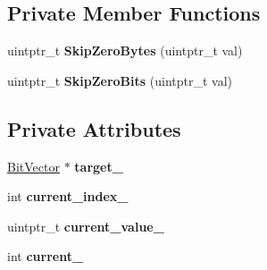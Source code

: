 \subsection*{Private Member Functions}
\begin{DoxyCompactItemize}
\item 
uintptr\+\_\+t {\bfseries Skip\+Zero\+Bytes} (uintptr\+\_\+t val)\hypertarget{classv8_1_1internal_1_1_bit_vector_1_1_b_a_s_e___e_m_b_e_d_d_e_d_ac69047709aebe576f894646bf5abe148}{}\label{classv8_1_1internal_1_1_bit_vector_1_1_b_a_s_e___e_m_b_e_d_d_e_d_ac69047709aebe576f894646bf5abe148}

\item 
uintptr\+\_\+t {\bfseries Skip\+Zero\+Bits} (uintptr\+\_\+t val)\hypertarget{classv8_1_1internal_1_1_bit_vector_1_1_b_a_s_e___e_m_b_e_d_d_e_d_a36d487012231ae329cf1cea935b838d4}{}\label{classv8_1_1internal_1_1_bit_vector_1_1_b_a_s_e___e_m_b_e_d_d_e_d_a36d487012231ae329cf1cea935b838d4}

\end{DoxyCompactItemize}
\subsection*{Private Attributes}
\begin{DoxyCompactItemize}
\item 
\hyperlink{classv8_1_1internal_1_1_bit_vector}{Bit\+Vector} $\ast$ {\bfseries target\+\_\+}\hypertarget{classv8_1_1internal_1_1_bit_vector_1_1_b_a_s_e___e_m_b_e_d_d_e_d_ac5fc3432c93f91aa3cb1d36f18b6f6b1}{}\label{classv8_1_1internal_1_1_bit_vector_1_1_b_a_s_e___e_m_b_e_d_d_e_d_ac5fc3432c93f91aa3cb1d36f18b6f6b1}

\item 
int {\bfseries current\+\_\+index\+\_\+}\hypertarget{classv8_1_1internal_1_1_bit_vector_1_1_b_a_s_e___e_m_b_e_d_d_e_d_aff34787082775a7b8f65867d569a71dc}{}\label{classv8_1_1internal_1_1_bit_vector_1_1_b_a_s_e___e_m_b_e_d_d_e_d_aff34787082775a7b8f65867d569a71dc}

\item 
uintptr\+\_\+t {\bfseries current\+\_\+value\+\_\+}\hypertarget{classv8_1_1internal_1_1_bit_vector_1_1_b_a_s_e___e_m_b_e_d_d_e_d_ac621531bb928327b02a1e1faae4eab47}{}\label{classv8_1_1internal_1_1_bit_vector_1_1_b_a_s_e___e_m_b_e_d_d_e_d_ac621531bb928327b02a1e1faae4eab47}

\item 
int {\bfseries current\+\_\+}\hypertarget{classv8_1_1internal_1_1_bit_vector_1_1_b_a_s_e___e_m_b_e_d_d_e_d_afd324f95adf5626fd829ce5e9975051f}{}\label{classv8_1_1internal_1_1_bit_vector_1_1_b_a_s_e___e_m_b_e_d_d_e_d_afd324f95adf5626fd829ce5e9975051f}

\end{DoxyCompactItemize}
